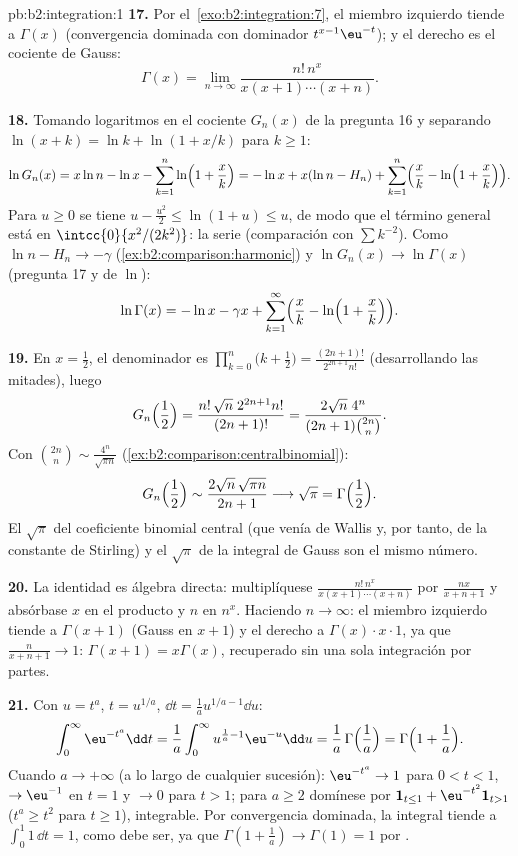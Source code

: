 \begin{solution}{pb:b2:integration:1}
\textbf{17.} Por el~\cref{exo:b2:integration:7}, el miembro
izquierdo tiende a $\Gamma(x)$ (convergencia dominada con dominador
$t^{x-1}\eu^{-t}$); y el derecho es el cociente de Gauss:
\[
\Gamma(x) = \lim_{n\to\infty}
\frac{n!\,n^x}{x(x+1)\cdots(x+n)} .
\]

\textbf{18.} Tomando logaritmos en el cociente $G_n(x)$ de la
pregunta 16 y separando $\ln(x+k) = \ln k + \ln(1 + x/k)$ para $k
\geq 1$:
\[
\ln G_n(x) = x\ln n - \ln x - \sum_{k=1}^n
\ln\Bigl(1+\frac xk\Bigr)
= -\ln x + x(\ln n - H_n)
+ \sum_{k=1}^n\Bigl(\frac xk -
\ln\Bigl(1+\frac xk\Bigr)\Bigr).
\]
Para $u \geq 0$ se tiene $u - \frac{u^2}2 \leq \ln(1+u) \leq u$, de
modo que el término general está en $\intcc{0}{x^2/(2k^2)}$: la
serie  (comparación con $\sum k^{-2}$). Como $\ln n - H_n
\to -\gamma$ (\cref{ex:b2:comparison:harmonic}) y $\ln G_n(x) \to
\ln\Gamma(x)$ (pregunta 17 y  de $\ln$):
\[
\ln\Gamma(x) = -\ln x - \gamma x
+ \sum_{k=1}^\infty\Bigl(\frac xk -
\ln\Bigl(1+\frac xk\Bigr)\Bigr) .
\]

\textbf{19.} En $x = \frac12$, el denominador es
$\prod_{k=0}^n\bigl(k+\frac12\bigr) =
\frac{(2n+1)!}{2^{2n+1}n!}$ (desarrollando las mitades), luego
\[
G_n\Bigl(\frac12\Bigr)
= \frac{n!\,\sqrt n\;2^{2n+1}n!}{(2n+1)!}
= \frac{2\sqrt n\;4^n}{(2n+1)\binom{2n}{n}} .
\]
Con $\binom{2n}{n} \sim \frac{4^n}{\sqrt{\pi n}}$
(\cref{ex:b2:comparison:centralbinomial}):
\[
G_n\Bigl(\frac12\Bigr)
\sim \frac{2\sqrt n\,\sqrt{\pi n}}{2n+1}
\longrightarrow \sqrt\pi = \Gamma\Bigl(\frac12\Bigr) .
\]
El $\sqrt\pi$ del coeficiente binomial central (que venía de
Wallis y, por tanto, de la constante de Stirling) y el $\sqrt\pi$
de la integral de Gauss son el mismo número.

\textbf{20.} La identidad es álgebra directa: multiplíquese
$\frac{n!\,n^x}{x(x+1)\cdots(x+n)}$ por $\frac{nx}{x+n+1}$ y
absórbase $x$ en el producto y $n$ en $n^x$. Haciendo $n \to
\infty$: el miembro izquierdo tiende a $\Gamma(x+1)$ (Gauss en
$x+1$) y el derecho a $\Gamma(x)\cdot x\cdot 1$, ya que
$\frac{n}{x+n+1} \to 1$: $\Gamma(x+1) = x\Gamma(x)$, recuperado
sin una sola integración por partes.

\textbf{21.} Con $u = t^a$, $t = u^{1/a}$, $\dd t = \frac1a u^{1/a
- 1}\dd u$:
\[
\int_0^\infty \eu^{-t^a}\dd t
= \frac1a\int_0^\infty u^{\frac1a - 1}\eu^{-u}\dd u
= \frac1a\,\Gamma\Bigl(\frac1a\Bigr)
= \Gamma\Bigl(1 + \frac1a\Bigr) .
\]
Cuando $a \to +\infty$ (a lo largo de cualquier sucesión):
$\eu^{-t^a} \to 1$ para $0 < t < 1$, $\to \eu^{-1}$ en $t = 1$ y
$\to 0$ para $t > 1$; para $a \geq 2$ domínese por $\mathbf 1_{t
\leq 1} + \eu^{-t^2}\mathbf 1_{t > 1}$ ($t^a \geq t^2$ para $t
\geq 1$), integrable. Por convergencia dominada, la integral
tiende a $\int_0^1 1\,\dd t = 1$, como debe ser, ya que $\Gamma(1
+ \frac1a) \to \Gamma(1) = 1$ por .


\end{solution}
